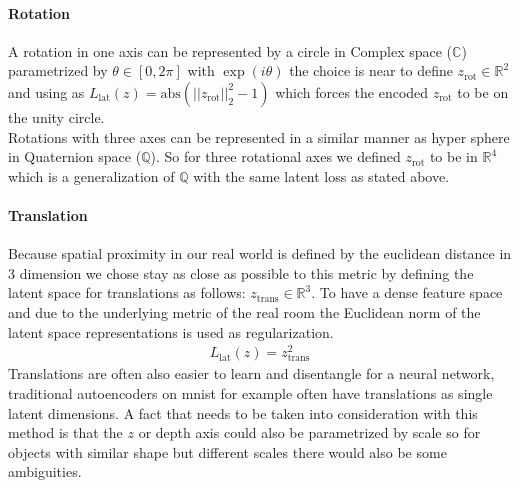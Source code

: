 \documentclass[10pt,a4paper]{article}
\newcommand{\rot}{\ensuremath{\text{rot}\xspace}}
\newcommand{\trans}{\ensuremath{\text{trans}\xspace}}
\begin{document}
\paragraph{Rotation} A rotation in one axis can be represented by a circle in Complex space ($\mathbb{C}$) parametrized by $\theta \in [0, 2 \pi]$ with $\exp(i \theta)$ the choice  is near to define $z_{\rot} \in \mathbb{R}^2$ and using as $L_{\text{lat}}(z) = \text{abs} (||z_{\rot}||_2^2 -1)$ which forces the encoded $z_{\rot}$ to be on the unity circle. \\ 
Rotations with three axes can be represented in a similar manner as hyper sphere in Quaternion space ($\mathbb{Q}$). So for three rotational axes we defined $z_{\rot}$ to be in $\mathbb{R}^4$ which is a generalization of $\mathbb{Q}$ with the same latent loss as stated above.\\
\paragraph{Translation} Because spatial proximity in our real world is defined by the euclidean distance in 3 dimension we chose stay as close as possible to this metric by defining the latent space for translations as follows: $z_{\trans} \in \mathbb{R}^3$. To have a dense feature space and due to the underlying metric of the real room the Euclidean norm of the latent space representations is used as regularization.
\begin{equation}
 \begin{aligned}
L_{\text{lat}}(z) = z_{\trans}^2
\end{aligned}
\end{equation}
Translations are often also easier to learn and disentangle for a neural network, traditional autoencoders on mnist for example often have translations as single latent dimensions. A fact that needs to be taken into consideration with this method is that the $z$ or depth axis could also be parametrized by scale so for objects with similar shape but different scales there would also be some ambiguities.

\newpage
\end{document}
